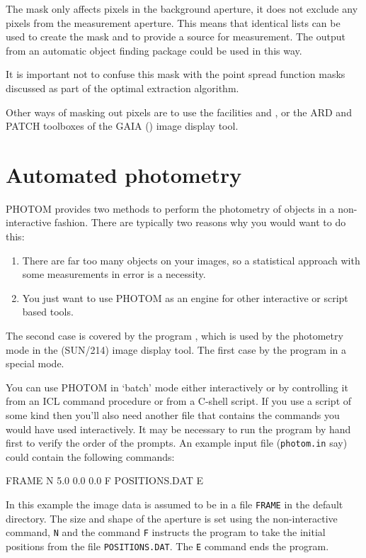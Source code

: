 \documentclass[twoside,11pt,nolof]{starlink}
\begin{document}
The mask only affects pixels in the background aperture, it does not
exclude any pixels from the measurement aperture. This means that
identical lists can be used to create the mask and to provide a source
for measurement. The output from an automatic object finding package
could be used in this way.

It is important not to confuse this mask with the point spread function
masks discussed as part of the optimal extraction algorithm.

Other ways of masking out pixels are to use the 
 facilities  and
, or the ARD and PATCH toolboxes
of the GAIA () image display tool.

\section{Automated photometry}

PHOTOM provides two methods to perform the photometry of objects in a
non-interactive fashion. There are typically two reasons why you would
want to do this:
\begin{enumerate}
\item There are far too many objects on your images, so a statistical
      approach with some measurements in error is a necessity.
\item You just want to use PHOTOM as an engine for other interactive
      or script based tools.
\end{enumerate}
The second case is covered by the program
, which is used by the photometry mode
in the  (SUN/214) image display tool. The first
case by the  program in a special mode.

You can use PHOTOM in `batch' mode either interactively or by
controlling it from an ICL command procedure or from a C-shell script.
If you use a script of some kind then you'll also need another file
that contains the commands you would have used interactively.  It may be
necessary to run the program by hand first to verify the order of the
prompts. An example input file (\texttt{photom.in} say) could contain the
following commands:
\begin{terminalv}
FRAME
N
5.0
0.0
0.0
F
POSITIONS.DAT
E
\end{terminalv}
In this example the image data is assumed to be in a file \texttt{FRAME}
in the default directory. The size and shape of the aperture is set
using the non-interactive command, \texttt{N} and the command \texttt{F}
instructs the program to take the initial positions from the file
\texttt{POSITIONS.DAT}. The \texttt{E} command ends the program.
\end{document}
